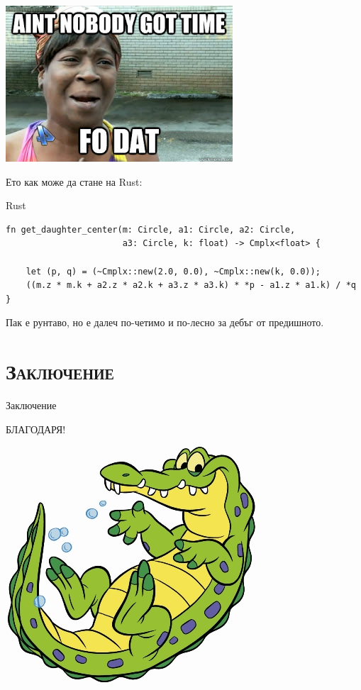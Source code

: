 \documentclass[xcolor=x11names,compress]{beamer}
\renewcommand{\(}{\begin{columns}}
\renewcommand{\)}{\end{columns}}
\newcommand{\<}[1]{\begin{column}{#1}}
\renewcommand{\>}{\end{column}}
\begin{document}
\begin{frame}
  \begin{center}
    \includegraphics[scale=0.9]{notime}
  \end{center}
\end{frame}

\begin{frame}[fragile]
  Ето как може да стане на Rust:

  \pause
  \begin{block}{Rust}
    \begin{lstlisting}[basicstyle=\tiny]
fn get_daughter_center(m: Circle, a1: Circle, a2: Circle,
                       a3: Circle, k: float) -> Cmplx<float> {

    let (p, q) = (~Cmplx::new(2.0, 0.0), ~Cmplx::new(k, 0.0));
    ((m.z * m.k + a2.z * a2.k + a3.z * a3.k) * *p - a1.z * a1.k) / *q
}
    \end{lstlisting}
  \end{block}

  \pause
  Пак е рунтаво, но е далеч по-четимо и по-лесно за дебъг от предишното.
\end{frame}

\section{\scshape Заключение}
\begin{frame}
  \begin{center}
    \Huge Заключение
  \end{center}
\end{frame}

\begin{frame}
  \begin{center}
    \huge БЛАГОДАРЯ!\vspace{1cm}

    \includegraphics{Crocodile}
  \end{center}
\end{frame}
\end{document}
